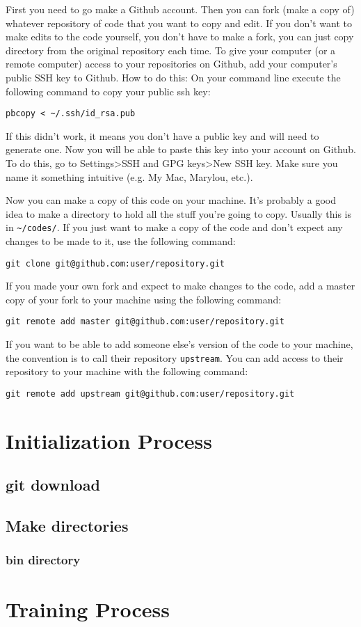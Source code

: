 \documentclass{article}
\begin{document}
First you need to go make a Github account. Then you can fork (make a
copy of) whatever repository of code that you want to copy and
edit. If you don't want to make edits to the code yourself, you don't
have to make a fork, you can just copy directory from the original
repository each time.
To give your computer (or a remote computer) access to your repositories
on Github, add your computer's public SSH key to Github. How to do
this:
On your command line execute the following command to copy
your public ssh key:
\begin{verbatim}
pbcopy < ~/.ssh/id_rsa.pub
\end{verbatim}
If this didn't work, it means you don't have a public key and will
need to generate one.
Now you will be able to paste this key into your account on Github. To
do this, go to Settings>SSH and GPG keys>New SSH key. Make sure you
name it something intuitive (e.g. My Mac, Marylou, etc.).

Now you can make a copy of this code on your machine. It's probably a
good idea to make a directory to hold all the stuff you're going to
copy. Usually this is in \verb|~/codes/|. If you just want to make a
copy of the code and don't expect any changes to be made to it, use
the following command:
\begin{verbatim}
git clone git@github.com:user/repository.git
\end{verbatim}
If you made your own fork and  expect to make changes to the code, add
a master copy of your fork to your machine using the following command:
\begin{verbatim}
git remote add master git@github.com:user/repository.git
\end{verbatim}
If you want to be able to add someone else's version of the code to
your machine, the convention is to call their repository
\verb|upstream|. You can add access to their repository to your
machine with the following command:
\begin{verbatim}
git remote add upstream git@github.com:user/repository.git
\end{verbatim}

                        
\section{Initialization Process}
\subsection{git download}
\subsection{Make directories}
\subsubsection{bin directory}
\section{Training Process}                      
\end{document}
